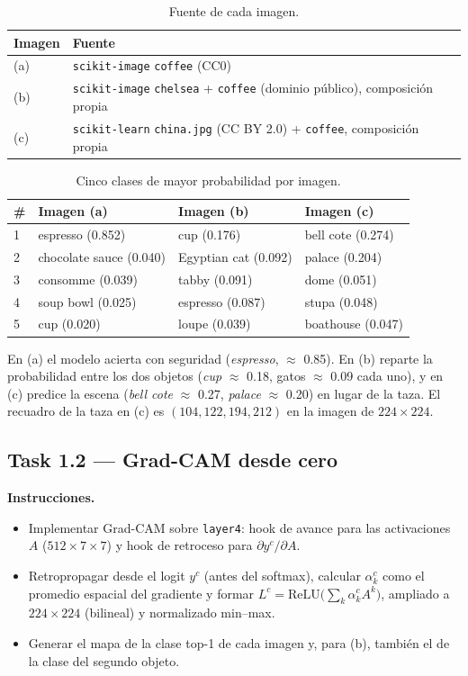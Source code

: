 \documentclass[11pt]{article}
\renewcommand{\_}{\textunderscore\allowbreak{}}
\begin{document}
\begin{table}[H]
\centering
\small
\begin{tabular}{ll}
\toprule
Imagen & Fuente \\
\midrule
(a) & \texttt{scikit-image} \texttt{coffee} (CC0) \\
(b) & \texttt{scikit-image} \texttt{chelsea} + \texttt{coffee} (dominio público), composición propia \\
(c) & \texttt{scikit-learn} \texttt{china.jpg} (CC BY 2.0) + \texttt{coffee}, composición propia \\
\bottomrule
\end{tabular}
\caption{Fuente de cada imagen.}
\end{table}

\begin{table}[H]
\centering
\small
\begin{tabular}{llll}
\toprule
\# & Imagen (a) & Imagen (b) & Imagen (c) \\
\midrule
1 & espresso (0.852) & cup (0.176) & bell cote (0.274) \\
2 & chocolate sauce (0.040) & Egyptian cat (0.092) & palace (0.204) \\
3 & consomme (0.039) & tabby (0.091) & dome (0.051) \\
4 & soup bowl (0.025) & espresso (0.087) & stupa (0.048) \\
5 & cup (0.020) & loupe (0.039) & boathouse (0.047) \\
\bottomrule
\end{tabular}
\caption{Cinco clases de mayor probabilidad por imagen.}
\end{table}

En (a) el modelo acierta con seguridad (\emph{espresso}, \(\approx\) 0.85). En (b) reparte la probabilidad entre los dos objetos (\emph{cup} \(\approx\) 0.18, gatos \(\approx\) 0.09 cada uno), y en (c) predice la escena (\emph{bell cote} \(\approx\) 0.27, \emph{palace} \(\approx\) 0.20) en lugar de la taza. El recuadro de la taza en (c) es \((104, 122, 194, 212)\) en la imagen de \(224\times224\).


\subsection*{Task 1.2 --- Grad-CAM desde cero}
\textbf{Instrucciones.}
\begin{itemize}
  \item Implementar Grad-CAM sobre \texttt{layer4}: hook de avance para las activaciones $A$ ($512\times7\times7$) y hook de retroceso para $\partial y^c/\partial A$.
  \item Retropropagar desde el logit $y^c$ (antes del softmax), calcular $\alpha_k^c$ como el promedio espacial del gradiente y formar $L^c=\mathrm{ReLU}\big(\sum_k\alpha_k^cA^k\big)$, ampliado a $224\times224$ (bilineal) y normalizado min--max.
  \item Generar el mapa de la clase top-1 de cada imagen y, para (b), también el de la clase del segundo objeto.
\end{itemize}
\end{document}

